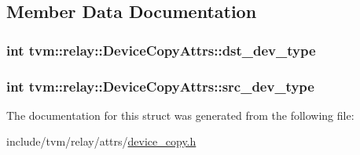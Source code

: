 \subsection{Member Data Documentation}
\subsubsection[{\texorpdfstring{dst\+\_\+dev\+\_\+type}{dst_dev_type}}]{\setlength{\rightskip}{0pt plus 5cm}int tvm\+::relay\+::\+Device\+Copy\+Attrs\+::dst\+\_\+dev\+\_\+type}\hypertarget{structtvm_1_1relay_1_1DeviceCopyAttrs_a1d264207360a6f321e1704dfa9d4038a}{}\label{structtvm_1_1relay_1_1DeviceCopyAttrs_a1d264207360a6f321e1704dfa9d4038a}
\subsubsection[{\texorpdfstring{src\+\_\+dev\+\_\+type}{src_dev_type}}]{\setlength{\rightskip}{0pt plus 5cm}int tvm\+::relay\+::\+Device\+Copy\+Attrs\+::src\+\_\+dev\+\_\+type}\hypertarget{structtvm_1_1relay_1_1DeviceCopyAttrs_ab8635461aed46b0f43db3b9c26c45ef0}{}\label{structtvm_1_1relay_1_1DeviceCopyAttrs_ab8635461aed46b0f43db3b9c26c45ef0}


The documentation for this struct was generated from the following file\+:\begin{DoxyCompactItemize}
\item 
include/tvm/relay/attrs/\hyperlink{device__copy_8h}{device\+\_\+copy.\+h}\end{DoxyCompactItemize}
